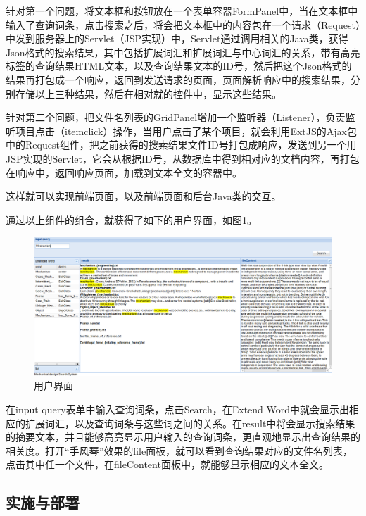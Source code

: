 \documentclass[12pt,a4paper]{article}
\newcommand{\wuhao}{\fontsize{10.5pt}{\baselineskip}\selectfont}
\begin{document}
	针对第一个问题，将文本框和按钮放在一个表单容器{\Times FormPanel}中，当在文本框中输入了查询词条，点击搜索之后，将会把文本框中的内容包在一个请求（{\Times Request}）中发到服务器上的{\Times Servlet}（{\Times JSP}实现）中，{\Times Servlet}通过调用相关的{\Times Java}类，获得{\Times Json}格式的搜索结果，其中包括扩展词汇和扩展词汇与中心词汇的关系，带有高亮标签的查询结果{\Times HTML}文本，以及查询结果文本的{\Times ID}号，然后把这个{\Times Json}格式的结果再打包成一个响应，返回到发送请求的页面，页面解析响应中的搜索结果，分别存储以上三种结果，然后在相对就的控件中，显示这些结果。
	
	针对第二个问题，把文件名列表的{\Times GridPanel}增加一个监听器（{\Times Listener}），负责监听项目点击（{\Times itemclick}）操作，当用户点击了某个项目，就会利用{\Times ExtJS}的{\Times Ajax}包中的{\Times Request}组件，把之前获得的搜索结果文件{\Times ID}号打包成响应，发送到另一个用{\Times JSP}实现的{\Times Servlet}，它会从根据{\Times ID}号，从数据库中得到相对应的文档内容，再打包在响应中，返回响应页面，加载到文本全文的容器中。
	
	这样就可以实现前端页面，以及前端页面和后台{\Times Java}类的交互。	

	通过以上组件的组合，就获得了如下的用户界面，如图\ref{fig:用户界面}。
	\begin{figure}[htbp] 
	\centering\includegraphics[width=6in]{fig/GUI.png} 
	\caption{\wuhao 用户界面}\label{fig:用户界面} 
	\end{figure} 
		
	在{\Times input query}表单中输入查询词条，点击{\Times Search}，在{\Times Extend Word}中就会显示出相应的扩展词汇，以及查询词条与这些词之间的关系。在{\Times result}中将会显示搜索结果的摘要文本，并且能够高亮显示用户输入的查询词条，更直观地显示出查询结果的相关度。打开“手风琴”效果的{\Times file}面板，就可以看到查询结果对应的文件名列表，点击其中任一个文件，在{\Times fileContent}面板中，就能够显示相应的文本全文。
	
	
	\subsection{实施与部署}
	
\end{document}
